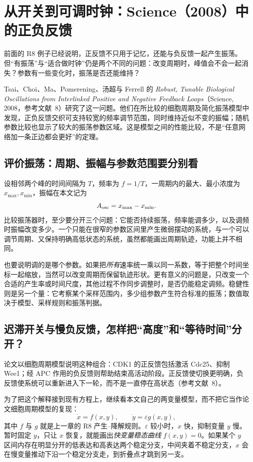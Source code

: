 \chapter{从开关到可调时钟：Science（2008）中的正负反馈}
前面的 R8 例子已经说明，正反馈不只用于记忆，还能与负反馈一起产生振荡。但“有振荡”与“适合做时钟”仍是两个不同的问题：改变周期时，峰值会不会一起消失？参数有一些变化时，振荡是否还能维持？

Tsai、Choi、Ma、Pomerening、汤超与 Ferrell 的 \emph{Robust, Tunable Biological Oscillations from Interlinked Positive and Negative Feedback Loops}（Science, 2008，参考文献~8）研究了这一问题。他们在所比较的细胞周期及简化振荡模型中发现，正负反馈交织可支持较宽的频率调节范围，同时维持近似不变的振幅；随机参数比较也显示了较大的振荡参数区域。这是模型之间的性能比较，不是“任意网络加一条正边都会更好”的定理。

\section{评价振荡：周期、振幅与参数范围要分别看}
设相邻两个峰的时间间隔为 $T$，频率为 $f=1/T$，一周期内的最大、最小浓度为 $x_{\max},x_{\min}$，振幅在本文记为
\[
A_{\rm osc}=x_{\max}-x_{\min}.
\]
比较振荡器时，至少要分开三个问题：它能否持续振荡，频率能调多少，以及调频时振幅改变多少。一个只能在很窄的参数区间里产生微弱摆动的系统，与一个可以调节周期、又保持明确高低状态的系统，虽然都能画出周期轨迹，功能上并不相同。

也要说明调的是哪个参数。如果把\emph{所有}速率统一乘以同一系数，等于把整个时间坐标一起缩放，当然可以改变周期而保留轨迹形状。更有意义的问题是，只改变一个合适的产生率或时间尺度，其他过程不作同步调整时，是否仍能稳定调频。稳健性则是另一个量：它考察某个采样范围内，多少组参数产生符合标准的振荡；数值取决于模型、采样规则和振荡判据。

\section{迟滞开关与慢负反馈，怎样把“高度”和“等待时间”分开？}
论文以细胞周期模型说明这种组合：CDK1 的正反馈包括激活 Cdc25、抑制 Wee1；经 APC 作用的负反馈则帮助结束高活动阶段。正反馈使切换更明确，负反馈使系统可以重新进入下一轮，而不是一直停在高状态（参考文献~8）。

为了把这个解释接到现有方程上，继续看本文自己的两变量模型，而不把它当作论文细胞周期模型的复现：
\[
\dot x=f(x,y),\qquad\dot y=\varepsilon g(x,y),
\]
其中 $f$ 与 $g$ 就是上一章的 R8 产生--降解规则。$\varepsilon$ 较小时，$x$ 快，抑制变量 $y$ 慢。暂时固定 $y$，只让 $x$ 恢复，就能画出\emph{快变量稳态曲线} $f(x,y)=0$。如果某个 $y$ 区间内存在明显分开的低表达和高表达两个稳定分支，中间夹着不稳定分支，$x$ 会在慢变量推动下沿一个稳定分支走，到折叠点才跳到另一支。

